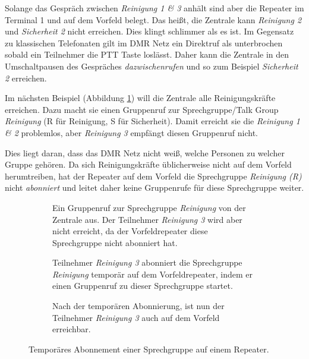 Solange das Gespräch zwischen \emph{Reinigung 1 \& 3} anhält sind aber die Repeater im Terminal 1 und auf dem Vorfeld belegt. Das heißt, die Zentrale kann \emph{Reinigung 2} und \emph{Sicherheit 2} nicht erreichen. Dies klingt schlimmer als es ist. Im Gegensatz zu klassischen Telefonaten gilt im DMR Netz ein Direktruf als unterbrochen sobald ein Teilnehmer die PTT Taste loslässt. Daher kann die Zentrale in den Umschaltpausen des Gespräches \emph{dazwischenrufen} und so zum Beispiel \emph{Sicherheit 2} erreichen. 

Im nächsten Beispiel (Abbildung \ref{fig:exnet3}) will die Zentrale alle Reinigungskräfte erreichen. Dazu macht sie einen Gruppenruf zur Sprechgruppe/Talk Group \emph{Reinigung} (R für Reinigung, S für Sicherheit). Damit erreicht sie die \emph{Reinigung 1 \& 2} problemlos, aber \emph{Reinigung 3} empfängt diesen Gruppenruf nicht. 

Dies liegt daran, dass das DMR Netz nicht weiß, welche Personen zu welcher Gruppe gehören. Da sich Reinigungskräfte üblicherweise nicht auf dem Vorfeld herumtreiben, hat der Repeater auf dem Vorfeld die Sprechgruppe \emph{Reinigung (R)} nicht \emph{abonniert} und leitet daher keine Gruppenrufe für diese Sprechgruppe weiter. 

\begin{figure}[p]
 \begin{subfigure}{\linewidth}
  \centering
  
  \caption{Ein Gruppenruf zur Sprechgruppe \emph{Reinigung} von der Zentrale aus. Der Teilnehmer \emph{Reinigung 3} wird aber nicht erreicht, da der Vorfeldrepeater diese Sprechgruppe nicht abonniert hat.} \label{fig:exnet3}
 \end{subfigure}\vspace{0.5cm}
 \begin{subfigure}{\linewidth}
  \centering
  
  \caption{Teilnehmer \emph{Reinigung 3} abonniert die Sprechgruppe \emph{Reinigung} temporär auf dem Vorfeldrepeater, indem er einen Gruppenruf zu dieser Sprechgruppe startet.} \label{fig:exnet4a} 
 \end{subfigure}\vspace{.5cm}
 \begin{subfigure}{\linewidth}
  \centering
  
  \caption{Nach der temporären Abonnierung, ist nun der Teilnehmer \emph{Reinigung 3} auch auf dem Vorfeld erreichbar.} \label{fig:exnet4b}
 \end{subfigure}
 \caption{Temporäres Abonnement einer Sprechgruppe auf einem Repeater.} \label{fig:exnet4}
\end{figure}

